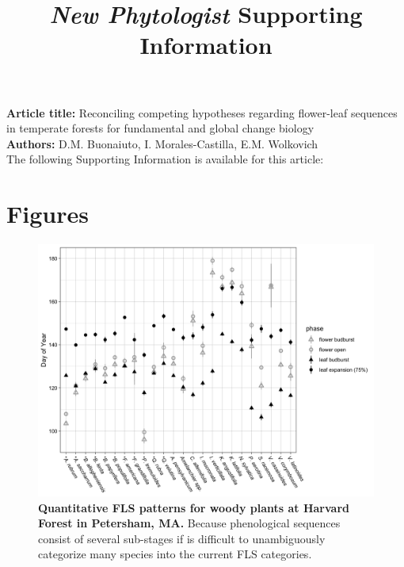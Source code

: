 \documentclass[11pt]{article}
\title{\textit{New Phytologist} Supporting Information}
\date{}
\begin{document}
\maketitle

\noindent \textbf{Article title:} Reconciling competing hypotheses regarding flower-leaf sequences in temperate forests for fundamental and global change biology\\
\noindent \textbf{Authors:} D.M. Buonaiuto, I. Morales-Castilla, E.M. Wolkovich\\

\noindent The following Supporting Information is available for this article:\\

\pagebreak[4]

\section*{Figures}


\begin{figure}[H]
    \centering
 \includegraphics[width=\textwidth]{..//..//HarvardForest/HFmeans_expanded.jpeg} 
    \caption{\textbf{Quantitative FLS patterns for woody plants at Harvard Forest in Petersham, MA.} Because phenological sequences consist of several sub-stages if is difficult to unambiguously categorize many species into the current FLS categories. }
    \label{fig:HFmeans}
\end{figure}
\end{document}
